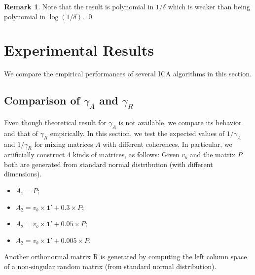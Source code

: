 \documentclass[twoside]{article}
\theoremstyle{definition}
\newtheorem{remark}[lemma]{Remark}
\begin{document}
\begin{remark}
Note that the result is polynomial in $1/\delta$ which is weaker than being polynomial in $\log(1/\delta)$. \qed
\end{remark}

\section{Experimental Results}
\label{sec:ExpRes}
We compare the empirical performances of several ICA algorithms in this section. 
\subsection{Comparison of $\gamma_A$ and $\gamma_R$}
\label{subsec:comparisonGamma}
Even though theoretical result for $\gamma_A$ is not available, we compare its behavior and that of $\gamma_R$ empirically. 
In this section, we test the expected values of $1/\gamma_A$ and $1/\gamma_R$ for mixing matrices $A$ with different coherences.
In particular, we artificially construct 4 kinds of matrices, as follows:
Given $v_b$ and the matrix $P$ both are generated from standard normal distribution (with different dimensions).
\begin{itemize}
\vspace{-3mm}
\item $A_1 = P$;
\item $A_2 = v_b\times\boldsymbol{1}' + 0.3\times P$;
\item $A_2 = v_b\times\boldsymbol{1}' + 0.05\times P$;
\item $A_2 = v_b\times\boldsymbol{1}' + 0.005\times P$.
\end{itemize}
\vspace{-2mm}
Another orthonormal matrix R is generated by computing the left column space of a non-singular random matrix (from standard normal distribution).  
\end{document}
